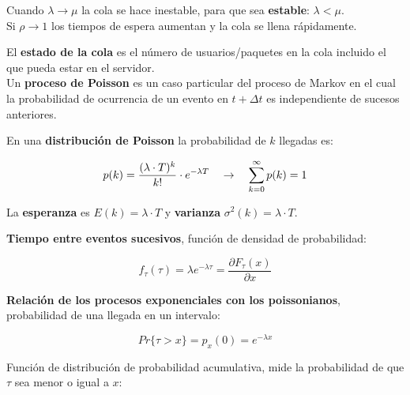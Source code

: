 \documentclass[10pt,landscape]{article}
\begin{document}
\begin{multicols}{3}
\begin{center}
\end{center}

Cuando $\lambda \rightarrow \mu$ la cola se hace inestable, para que sea \textbf{estable}: $\lambda < \mu$.\\
	
Si $\rho \rightarrow 1$ los tiempos de espera aumentan y la cola se llena rápidamente.

El \textbf{estado de la cola} es el número de usuarios/paquetes en la cola incluido el que pueda estar en el servidor.\\

Un \textbf{proceso de Poisson} es un caso particular del proceso de Markov en el cual la probabilidad de ocurrencia de un evento en $t + \Delta t$ es independiente de sucesos anteriores.

En una \textbf{distribución de Poisson} la probabilidad de $k$ llegadas es:

	\begin{equation*}
		p(k) = \frac{(\lambda \cdot T)^k}{k!} \cdot e^{- \lambda T} \hspace{10 pt} \rightarrow \hspace{10 pt}  \sum_{k=0}^{\infty} p(k) = 1
	\end{equation*}
	
La \textbf{esperanza} es $E(k)= \lambda \cdot T$ y \textbf{varianza} $\sigma^{2} (k) = \lambda \cdot T$.


\textbf{Tiempo entre eventos sucesivos}, función de densidad de probabilidad:

	\begin{equation*}
		f_{\tau} (\tau) = \lambda e^{- \lambda \tau}	 = \frac{\partial F_{\tau}(x)}{\partial x}
	\end{equation*}


\textbf{Relación de los procesos exponenciales con los poissonianos}, probabilidad de una llegada en un intervalo:

	\begin{equation*}
		Pr\{ \tau > x \} = p_{x}(0) = e^{-\lambda x}
	\end{equation*}
	
Función de distribución de probabilidad acumulativa, mide la probabilidad de que $\tau$ sea menor o igual a $x$:


\end{multicols}
\end{document}
